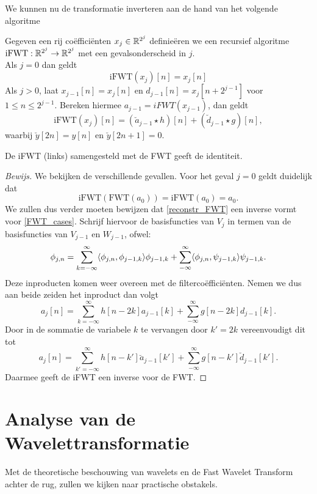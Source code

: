 We kunnen nu de transformatie inverteren aan de hand van het volgende algoritme
\begin{algo}
  Gegeven een rij co\"effici\"enten $x_j\in\mathbb{R}^{2^j}$ definie\"eren we een recursief
  algoritme $\mathrm{iFWT}:\mathbb{R}^{2^j}\to\mathbb{R}^{2^j}$ met een gevalsonderscheid in $j$.\\
  Als $j=0$ dan geldt
  \[
  \mathrm{iFWT}(x_j)[n] = x_j[n]
  \]
  Als $j>0$, laat $x_{j-1}[n] = x_j[n]$ en $d_{j-1}[n] = x_j[n+2^{j-1}]$ voor $1\leq n\leq 2^{j-1}$. 
  Bereken hiermee $a_{j-1} = iFWT(x_{j-1})$,
  dan geldt
  \begin{equation}
    \label{reconstr_FWT}
    \mathrm{iFWT}(x_j)[n] = (\breve a_{j-1}\star h)[n] + (\breve d_{j-1}\star g)[n],
  \end{equation}
  waarbij $\breve y [2n] = y[n]$ en $\breve y [2n+1] = 0$.
\end{algo}
\begin{stelling}
  De iFWT (links) samengesteld met de FWT geeft de identiteit.
\end{stelling}
\begin{proof}[Bewijs]
  We bekijken de verschillende gevallen. Voor het geval $j=0$ geldt duidelijk dat
  \[
  \mathrm{iFWT}(\mathrm{FWT}(a_0)) = \mathrm{iFWT}(a_0) = a_0.
  \]
  We zullen dus verder moeten bewijzen dat \eqref{reconstr_FWT} een inverse vormt voor
  \eqref{FWT_cases}.
  Schrijf hiervoor de basisfuncties van $V_j$ in termen van de basisfuncties van $V_{j-1}$
  en $W_{j-1}$, ofwel:
  \[
  \phi_{j,n} = \sum_{k=-\infty}^\infty \langle \phi_{j,n} , \phi_{j-1,k} \rangle\phi_{j-1,k}
  + \sum_{-\infty}^\infty \langle \phi_{j,n} , \psi_{j-1,k} \rangle\psi_{j-1,k}.
  \]
  Deze inproducten komen weer overeen met de filterco\"effici\"enten. Nemen we dus aan
  beide zeiden het inproduct dan volgt
  \[
  a_j[n] = \sum_{k=-\infty}^\infty h[n-2k]a_{j-1}[k]
  + \sum_{-\infty}^\infty g[n-2k]d_{j-1}[k].
  \]
  Door in de sommatie de variabele $k$ te vervangen door $k'=2k$ vereenvoudigt dit tot
  \[
  a_j[n] = \sum_{k'=-\infty}^\infty h[n-k']\breve a_{j-1}[k']
  + \sum_{-\infty}^\infty g[n-k']\breve d_{j-1}[k'].
  \]
  Daarmee geeft de iFWT een inverse voor de FWT.
\end{proof}

\section{Analyse van de Wavelettransformatie}
Met de theoretische beschouwing van wavelets en de Fast Wavelet Transform achter de rug, 
zullen we kijken naar practische obstakels.

